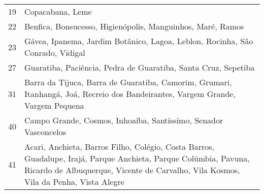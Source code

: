 \begin{tabular}{rl}
 19 &  Copacabana, Leme \\
 22 &  Benfica, Bonsucesso, Higienópolis, Manguinhos, Maré, Ramos \\
 23 &  Gávea, Ipanema, Jardim Botânico, Lagoa, Leblon, Rocinha, São Conrado, Vidigal \\
 27 &  Guaratiba, Paciência, Pedra de Guaratiba, Santa Cruz, Sepetiba \\
 31 &  Barra da Tijuca, Barra de Guaratiba, Camorim, Grumari, Itanhangá, Joá, Recreio dos Bandeirantes, Vargem Grande, Vargem Pequena \\
 40 &  Campo Grande, Cosmos, Inhoaíba, Santíssimo, Senador Vasconcelos \\
 41 &  Acari, Anchieta, Barros Filho, Colégio, Costa Barros, Guadalupe, Irajá, Parque Anchieta, Parque Colúmbia, Pavuna, Ricardo de Albuquerque, Vicente de Carvalho, Vila Kosmos, Vila da Penha, Vista Alegre \\
\bottomrule
\end{tabular}
